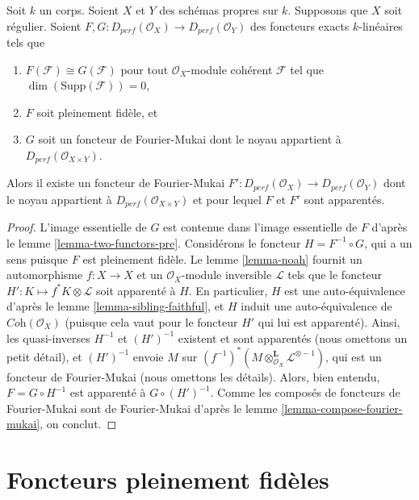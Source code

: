 \begin{lemma}
\label{lemma-two-functors}
Soit $k$ un corps. Soient $X$ et $Y$ des schémas propres sur $k$.
Supposons que $X$ soit régulier.
Soient $F, G : D_{perf}(\mathcal{O}_X) \to D_{perf}(\mathcal{O}_Y)$
des foncteurs exacts $k$-linéaires tels que
\begin{enumerate}
\item $F(\mathcal{F}) \cong G(\mathcal{F})$ pour tout
$\mathcal{O}_X$-module cohérent $\mathcal{F}$ tel que $\dim(\text{Supp}(\mathcal{F})) = 0$,
\item $F$ soit pleinement fidèle, et
\item $G$ soit un foncteur de Fourier-Mukai dont le noyau appartient à
$D_{perf}(\mathcal{O}_{X \times Y})$.
\end{enumerate}
Alors il existe un foncteur de Fourier-Mukai
$F' : D_{perf}(\mathcal{O}_X) \to D_{perf}(\mathcal{O}_Y)$
dont le noyau appartient à $D_{perf}(\mathcal{O}_{X \times Y})$
et pour lequel $F$ et $F'$ sont apparentés.
\end{lemma}

\begin{proof}
L'image essentielle de $G$ est contenue dans l'image essentielle
de $F$ d'après le lemme \ref{lemma-two-functors-pre}.
Considérons le foncteur $H = F^{-1} \circ G$,
qui a un sens puisque $F$ est pleinement fidèle.
Le lemme \ref{lemma-noah} fournit un automorphisme $f : X \to X$
et un $\mathcal{O}_X$-module inversible $\mathcal{L}$ tels que
le foncteur $H' : K \mapsto f^*K \otimes \mathcal{L}$
soit apparenté à $H$. En particulier,
$H$ est une auto-équivalence d'après le lemme \ref{lemma-sibling-faithful},
et $H$ induit une auto-équivalence de
$\textit{Coh}(\mathcal{O}_X)$ (puisque cela vaut pour le foncteur $H'$ qui lui est apparenté).
Ainsi, les quasi-inverses $H^{-1}$ et $(H')^{-1}$ existent et sont apparentés
(nous omettons un petit détail), et $(H')^{-1}$ envoie $M$ sur
$(f^{-1})^*(M \otimes_{\mathcal{O}_X}^\mathbf{L} \mathcal{L}^{\otimes -1})$,
qui est un foncteur de Fourier-Mukai (nous omettons les détails).
Alors, bien entendu, $F = G \circ H^{-1}$ est apparenté à
$G \circ (H')^{-1}$. Comme les composés de foncteurs de Fourier-Mukai
sont de Fourier-Mukai d'après le
lemme \ref{lemma-compose-fourier-mukai},
on conclut.
\end{proof}





\section{Foncteurs pleinement fidèles}
\label{section-fully-faithful}

